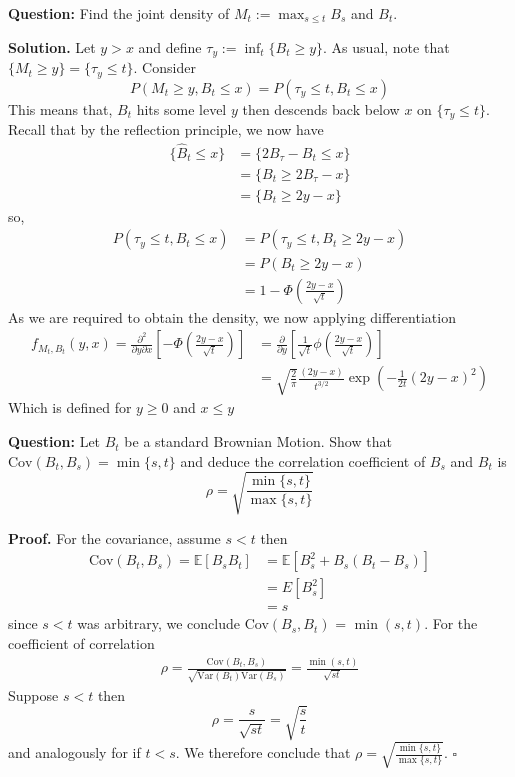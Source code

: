 \documentclass{article}
\begin{document}
\begin{tcolorbox}[colframe=black,colback=gray!5,boxrule=0.5pt]
\textbf{Question:} Find the joint density of $M_t := \max_{s\leq t} B_s$ and $B_t$. \cite{Fima}
\end{tcolorbox}
\textbf{Solution.} Let $y > x$ and define $\tau_y := \inf_{t}\{B_t \geq y\}$. As usual, note that $\{M_t \geq y\} = \{\tau_y\leq t\}$. Consider 
$$P(M_t\geq y, B_t\leq x) = P(\tau_y\leq t, B_t\leq x)$$
This means that, $B_t$ hits some level $y$ then descends back below $x$ on $\{\tau_y\leq t\}$. Recall that by the reflection principle, we now have 
\begin{align*}
    \{\hat{B}_t \leq x\} &= \{2B_{\tau} - B_t \leq x\} \\
    &= \{B_t\geq 2B_\tau - x\} \\
    &= \{B_t\geq 2y - x\}
\end{align*}
so, 
\begin{align*}
    P(\tau_y\leq t, B_t\leq x) &= P(\tau_y\leq t, B_t\geq2y- x) \\
    &= P(B_{t}\geq 2y-x) \\
    &= 1 - \Phi\left(\frac{2y-x}{\sqrt{t}}\right)
\end{align*}
As we are required to obtain the density, we now applying differentiation
\begin{align*}
    f_{M_t, B_t}(y,x) = \frac{\partial^2}{\partial y\partial x}\left[-\Phi\left(\frac{2y-x}{\sqrt{t}}\right)\right] &= \frac{\partial}{\partial y}\left[\frac{1}{\sqrt{t}}\phi\left(\frac{2y-x}{\sqrt{t}}\right)\right] \\
    &= \sqrt{\frac{2}{\pi}}\frac{(2y-x)}{t^{3/2}}\exp\left(-\frac{1}{2t}(2y-x)^2\right)
\end{align*}
Which is defined for $y\geq 0$ and $x\leq y$

\begin{tcolorbox}[colframe=black,colback=gray!5,boxrule=0.5pt]
\textbf{Question:} Let $B_t$ be a standard Brownian Motion. Show that $\text{Cov}(B_t,B_s) = \min\{s,t\}$ and deduce the correlation coefficient of $B_s$ and $B_t$ is $$\rho=\sqrt{\frac{\min\{s,t\}}{\max\{s,t\}}}$$
\end{tcolorbox}
\textbf{Proof.} For the covariance, assume $s<t$ then
\begin{align*}
    \text{Cov}(B_t,B_s) = \mathbb{E}[B_sB_t] &= \mathbb{E}[B_s^2+B_s(B_t-B_s)] \\
    &= E[B_s^2] \\
    &=s
\end{align*}
since $s<t$ was arbitrary, we conclude Cov$(B_s,B_t)$ = $\min(s,t)$. For the coefficient of correlation
\begin{align*}
    \rho = \frac{\text{Cov}(B_t,B_s)}{\sqrt{\text{Var}(B_t)\text{Var}(B_s)}} = \frac{\min(s,t)}{\sqrt{st}}
\end{align*}
Suppose $s<t$ then 
$$\rho = \frac{s}{\sqrt{st}} = \sqrt{\frac{s}{t}}$$
and analogously for if $t<s$. We therefore conclude that  $\rho=\sqrt{\frac{\min\{s,t\}}{\max\{s,t\}}}$. $\square$
\end{document}
